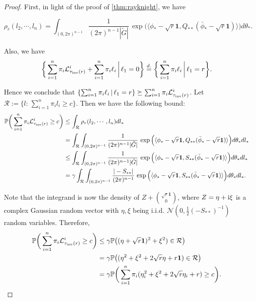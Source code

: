\documentclass[a4paper, 11pt]{article}
\renewcommand{\P}{\mathbb{P}}
\newcommand{\allone}{\mathbf{1}}
\newcommand{\Ell}{\mathcal{L}}
\newcommand{\inv}{\tau_\textnormal{inv}}
\newcommand{\compi}{\textnormal{i}}
\begin{document}
\begin{proof}
First, in light of the proof of \cref{thm:rayknight}, we have

\[\rho_r(l_2,\cdots, l_n) =  \int_{(0,2\pi)^{n-1}}\frac{1}{(2\pi)^{n-1}|\tilde{G}|}\,
\exp\Big(\langle \phi_*- \sqrt{r}\allone, Q_{**}(\bar{\phi}_*- \sqrt{r}\allone)\rangle\Big)d\theta_*.\]

Also, we have
\[\bigg\{\sum_{i=1}^n \pi_i\Ell_{\inv(r)}^i+\sum_{i=1}^n\pi_i\ell_i\,\bigg|\,\ell_1=0\bigg\}
\stackrel{d.}{=}
\bigg\{\sum_{i=1}^n\pi_i\ell_i\,\bigg|\,\ell_1=r\bigg\}.\]

Hence we conclude that $\{\sum_{i=1}^n\pi_i\ell_i\,|\,\ell_1=r\}\succeq\sum_{i=1}^n \pi_i\Ell_{\inv(r)}^i$. Let $\mathcal{R}:=\{l:\, \sum_{i=1}^n \pi_il_i\geq c\}$. Then we have the following bound:
\begin{equation*}
\begin{aligned}
\P\bigg(\sum_{i=1}^n \pi_i\Ell_{\inv(r)}^i\geq c\bigg) & \leq \int_\mathcal{R} \rho_r(l_2,\cdots,l_n)dl_*\\
& = \int_\mathcal{R} \int_{(0,2\pi)^{n-1}}\frac{1}{(2\pi)^{n-1}|\tilde{G}|}\,
\exp\Big(\langle \phi_*- \sqrt{r}\allone, Q_{**}(\bar{\phi}_*- \sqrt{r}\allone)\rangle\Big)d\theta_* dl_*\\
& \leq \int_\mathcal{R} \int_{(0,2\pi)^{n-1}}\frac{1}{(2\pi)^{n-1}|\tilde{G}|}\,
\exp\Big(\langle \phi_*- \sqrt{r}\allone, S_{**}(\bar{\phi}_*- \sqrt{r}\allone)\rangle\Big)d\theta_* dl_*\\
& = \gamma \int_\mathcal{R} \int_{(0,2\pi)^{n-1}}\frac{|-S_{**}|}{(2\pi)^{n-1}}\,
\exp\Big(\langle \phi_*- \sqrt{r}\allone, S_{**}(\bar{\phi}_*- \sqrt{r}\allone)\rangle\Big)d\theta_* dl_*.
\end{aligned}
\end{equation*}

Note that the integrand is now the density of $Z+{{\sqrt{r}\allone}\choose{0}}$, where $Z=\eta+\compi \xi$ is a complex Gaussian random vector with $\eta,\xi$ being i.i.d. $\mathcal{N}(0,\frac{1}{2}(-S_{**})^{-1})$ random variables. Therefore,
\begin{equation*}
\begin{aligned}
\P\bigg(\sum_{i=1}^n \pi_i\Ell_{\inv(r)}^i\geq c\bigg)
& \leq \gamma\P\big((\eta+\sqrt{r}\allone)^2+\xi^2)\in \mathcal{R}\big)\\
& = \gamma \P\big((\eta^2+\xi^2+2\sqrt{r}\eta+r\allone)\in \mathcal{R}\big)\\
& = \gamma \P\bigg(\sum_{i=1}^n \pi_i(\eta_i^2+\xi^2+2\sqrt{r}\eta_i+r)\geq c\bigg).
\end{aligned}
\end{equation*}


\end{proof}
\end{document}
